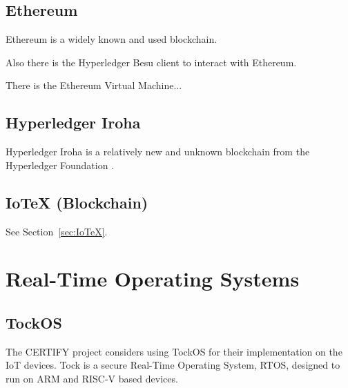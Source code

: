 \subsection{Ethereum} %
\label{sec:Ethereum}

Ethereum is a widely known and used blockchain.

Also there is the Hyperledger Besu \cite{hyperledger:wiki} client to interact with Ethereum.

There is the Ethereum Virtual Machine...

\subsection{Hyperledger Iroha} %
\label{sub:Hyperledger Iroha}

Hyperledger Iroha is a relatively new and unknown blockchain from the Hyperledger Foundation \cite{hyperledger:wiki}.

\subsection{IoTeX (Blockchain)} %
\label{sec:IoTeX-Blockchain}
See Section~\ref{sec:IoTeX}.


\section{Real-Time Operating Systems} %
\label{sec:Real-Time Operating Systems}

\subsection{TockOS} %
\label{sub:TockOS}

The CERTIFY project considers using TockOS for their implementation on the IoT devices.
Tock is a secure Real-Time Operating System, RTOS, designed to run on ARM and RISC-V based devices.

